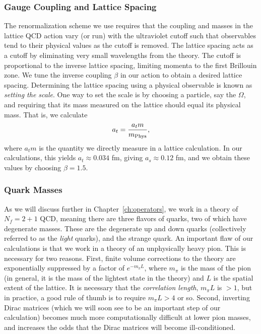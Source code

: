 \subsubsection{Gauge Coupling and Lattice Spacing}
The renormalization scheme we use requires that the coupling and masses in the lattice QCD action vary (or run) with the ultraviolet cutoff such that observables tend to their physical values as the cutoff is removed. The lattice spacing acts as a cutoff by eliminating very small wavelengths from the theory.  The cutoff is proportional to the inverse lattice spacing, limiting momenta to the first Brillouin zone. We tune the inverse coupling $\beta$ in our action to obtain a desired lattice spacing. Determining the lattice spacing using a physical observable is known as \emph{setting the scale}. One way to set the scale is by choosing a particle, say the $\Omega$, and requiring that its mass measured on the lattice should equal its physical mass. That is, we calculate
\begin{equation}
    a_t = \frac{a_t m}{m_{\rm{Phys}}},
\end{equation}
where $a_t m$ is the quantity we directly measure in a lattice calculation. In our calculations, this yields $a_t\approx 0.034$ fm, giving $a_s\approx 0.12$ fm, and we obtain these values by choosing $\beta = 1.5$.
\subsubsection{Quark Masses}
As we will discuss further in Chapter~\ref{ch:operators}, we work in a theory of $N_f=2+1$ QCD, meaning there are three flavors of quarks, two of which have degenerate masses. These are the degenerate up and down quarks (collectively referred to as the \emph{light} quarks), and the strange quark. An important flaw of our calculations is that we work in a theory of an unphysically heavy pion. This is necessary for two reasons. First, finite volume corrections to the theory are exponentially suppressed by a factor of $e^{-m_\pi L}$, where $m_\pi$ is the mass of the pion (in general, it is the mass of the lightest state in the theory) and $L$ is the spatial extent of the lattice. It is necessary that the \emph{correlation length}, $m_\pi L$ is $>1$, but in practice, a good rule of thumb is to require $m_\pi L > 4$ or so. Second, inverting Dirac matrices (which we will soon see to be an important step of our calculation) becomes much more computationally difficult at lower pion masses, and increases the odds that the Dirac matrices will become ill-conditioned.

